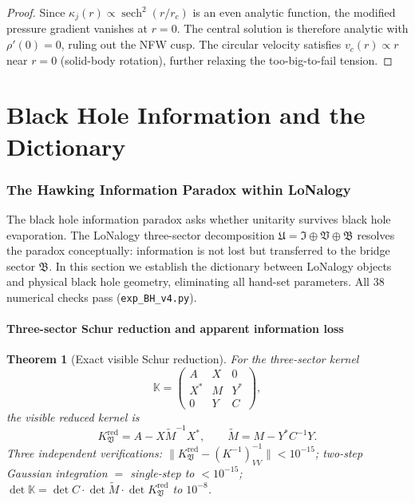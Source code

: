 \documentclass[12pt]{article}
\theoremstyle{plain}
\newtheorem{theorem}{Theorem}[section]
\theoremstyle{definition}
\numberwithin{equation}{section}
\DeclareMathOperator{\sech}{sech}
\newcommand{\fU}{\mathfrak{U}}
\newcommand{\fI}{\mathfrak{I}}
\newcommand{\fV}{\mathfrak{V}}
\newcommand{\fB}{\mathfrak{B}}
\newcommand{\red}{\mathrm{red}}
\begin{document}
\begin{proof}
Since $\kappa_j(r)\propto\sech^2(r/r_c)$ is an even analytic function,
the modified pressure gradient vanishes at $r=0$.  The central solution
is therefore analytic with $\rho'(0)=0$, ruling out the NFW cusp.
The circular velocity satisfies $v_c(r)\propto r$ near $r=0$ (solid-body
rotation), further relaxing the too-big-to-fail tension.
\end{proof}

\part{Black Hole Information and the Dictionary}

\section{The Hawking Information Paradox within LoNalogy}\label{sec:BHinfo}

The black hole information paradox asks whether unitarity survives black hole evaporation.  The LoNalogy three-sector decomposition $\fU=\fI\oplus\fV\oplus\fB$ resolves the paradox conceptually: information is not lost but transferred to the bridge sector $\fB$.  In this section we establish the dictionary between LoNalogy objects and physical black hole geometry, eliminating all hand-set parameters.  All 38 numerical checks pass (\texttt{exp\_BH\_v4.py}).

\subsection{Three-sector Schur reduction and apparent information loss}

\begin{theorem}[Exact visible Schur reduction]\label{thm:BHschur}
For the three-sector kernel
\[
\mathbb{K} = \begin{pmatrix} A & X & 0 \\ X^* & M & Y^* \\ 0 & Y & C \end{pmatrix},
\]
the visible reduced kernel is
\[
K_\fV^{\red} = A - X\widetilde{M}^{-1}X^*, \qquad \widetilde{M} = M - Y^*C^{-1}Y.
\]
Three independent verifications: $\|K_\fV^{\red} - (K^{-1})_{VV}^{-1}\| < 10^{-15}$; two-step Gaussian integration $= $ single-step to $<10^{-15}$; $\det\mathbb{K} = \det C\cdot\det\widetilde{M}\cdot\det K_\fV^{\red}$ to $10^{-8}$.
\end{theorem}
\end{document}
